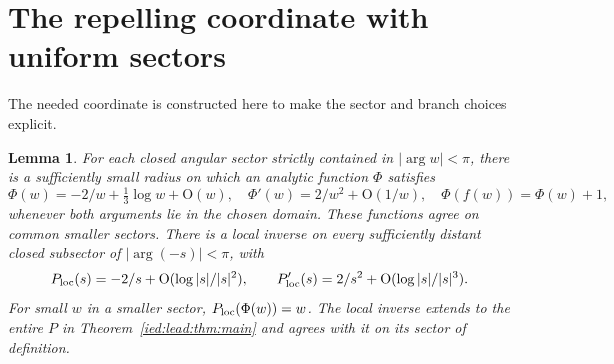 \documentclass[11pt,letterpaper]{article}
\newtheorem{lemma}[theorem]{Lemma}
\theoremstyle{remark}\newtheorem{remark}[theorem]{Remark}
\newcommand{\Oh}{\mathrm O}\newcommand{\supp}{\operatorname{supp}}
\begin{document}
\section{The repelling coordinate with uniform sectors}\label{ied:lead:sec:fatou}
The needed coordinate is constructed here to make the sector and branch choices explicit.
\begin{lemma}\label{ied:lead:lem:fatou}
For each closed angular sector strictly contained in $|\arg w|<\pi$, there is a sufficiently small radius on which an analytic function $\Phi$ satisfies
\begin{equation}\label{ied:lead:eq:fatou}
 \Phi(w)=-2/w+\tfrac13\log w+\Oh(w),\quad
 \Phi'(w)=2/w^2+\Oh(1/w),\quad
 \Phi(f(w))=\Phi(w)+1,
\end{equation}
whenever both arguments lie in the chosen domain. These functions agree on common smaller sectors. There is a local inverse on every sufficiently distant closed subsector of $|\arg(-s)|<\pi$, with
\begin{equation}\label{ied:lead:eq:Pinverse}
 P_{\rm loc}(s)=-2/s+\Oh(\log|s|/|s|^2),\qquad
 P_{\rm loc}'(s)=2/s^2+\Oh(\log|s|/|s|^3).
\end{equation}
For small $w$ in a smaller sector, $P_{\rm loc}(\Phi(w))=w$. The local inverse extends to the entire $P$ in Theorem~\ref{ied:lead:thm:main} and agrees with it on its sector of definition.
\end{lemma}
\end{document}
